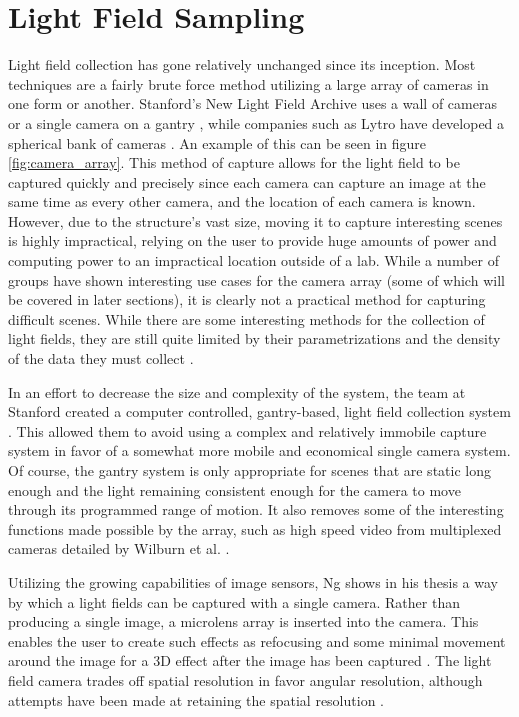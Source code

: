 \documentclass[12pt]{report}
\begin{document}
\section{Light Field Sampling}
Light field collection has gone relatively unchanged since its inception. Most techniques are a fairly brute force method utilizing a large array of cameras in one form or another. Stanford's New Light Field Archive uses a wall of cameras or a single camera on a gantry \cite{lfArchive}, while companies such as Lytro have developed a spherical bank of cameras \cite{lytro}. An example of this can be seen in figure \ref{fig:camera_array}. This method of capture allows for the light field to be captured quickly and precisely since each camera can capture an image at the same time as every other camera, and the location of each camera is known. However, due to the structure's vast size, moving it to capture interesting scenes is highly impractical, relying on the user to provide huge amounts of power and computing power to an impractical location outside of a lab. While a number of groups have shown interesting use cases for the camera array (some of which will be covered in later sections), it is clearly not a practical method for capturing difficult scenes. While there are some interesting methods for the collection of light fields, they are still quite limited by their parametrizations and the density of the data they must collect \cite{Ihrke16}.

In an effort to decrease the size and complexity of the system, the team at Stanford created a computer controlled, gantry-based, light field collection system \cite{Koller04}. This allowed them to avoid using a complex and relatively immobile capture system in favor of a somewhat more mobile and economical single camera system. Of course, the gantry system is only appropriate for scenes that are static long enough and the light remaining consistent enough for the camera to move through its programmed range of motion. It also removes some of the interesting functions made possible by the array, such as high speed video from multiplexed cameras detailed by Wilburn et al. \cite{Wilburn05}.

Utilizing the growing capabilities of image sensors, Ng shows in his thesis a way by which a light fields can be captured with a single camera. Rather than producing a single image, a microlens array is inserted into the camera. This enables the user to create such effects as refocusing and some minimal movement around the image for a 3D effect after the image has been captured \cite{Ng06, Ng05, Perwass12}. The light field camera trades off spatial resolution in favor angular resolution, although attempts have been made at retaining the spatial resolution \cite{Georgeiv06}.
\end{document}
